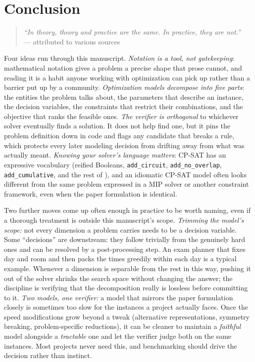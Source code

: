 \chapter{Conclusion}\label{chap:9}

\begin{quote}
\emph{``In theory, theory and practice are the same. In practice, they
are not.''}\\
--- attributed to various sources
\end{quote}

Four ideas run through this manuscript. \emph{Notation is a tool, not
gatekeeping}: mathematical notation gives a problem a precise shape
that prose cannot, and reading it is a habit anyone working with
optimization can pick up rather than a barrier put up by a community.
\emph{Optimization models decompose into five parts}: the entities the
problem talks about, the parameters that describe an instance, the
decision variables, the constraints that restrict their combinations,
and the objective that ranks the feasible ones. \emph{The verifier is
orthogonal} to whichever solver eventually finds a solution. It does
not help find one, but it pins the problem definition down in code and
flags any candidate that breaks a rule, which protects every later
modeling decision from drifting away from what was actually meant.
\emph{Knowing your solver's language matters}: CP-SAT has an
expressive vocabulary (reified Booleans,
\lstinline!add_circuit!,
\lstinline!add_no_overlap!,
\lstinline!add_cumulative!, and the rest of ),
and an idiomatic CP-SAT model often looks different from the same
problem expressed in a MIP solver or another constraint framework, even
when the paper formulation is identical.

Two further moves come up often enough in practice to be worth naming,
even if a thorough treatment is outside this manuscript's scope.
\emph{Trimming the model's scope:} not every dimension a problem carries
needs to be a decision variable. Some ``decisions'' are downstream:
they follow trivially from the genuinely hard ones and can be resolved
by a post-processing step. An exam planner that fixes day and room and
then packs the times greedily within each day is a typical example.
Whenever a dimension is separable from the rest in this way, pushing it
out of the solver shrinks the search space without changing the answer;
the discipline is verifying that the decomposition really is lossless
before committing to it. \emph{Two models, one verifier:} a model that
mirrors the paper formulation closely is sometimes too slow for the
instances a project actually faces. Once the speed modifications grow
beyond a tweak (alternative representations, symmetry breaking,
problem-specific reductions), it can be cleaner to maintain a
\emph{faithful} model alongside a \emph{tractable} one and let the
verifier judge both on the same instances. Most projects never need
this, and benchmarking should drive the decision rather than instinct.

